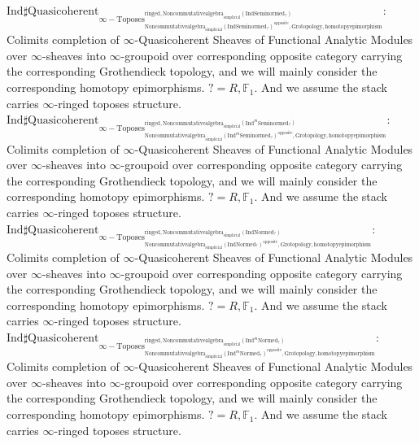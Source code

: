\documentclass[11pt]{book}
\theoremstyle{definition}
\numberwithin{equation}{section}
\begin{document}
 \noindent $\mathrm{Ind}\mathrm{\sharp Quasicoherent}_{\infty-\mathrm{Toposes}^{\mathrm{ringed},\mathrm{Noncommutativealgebra}_{\mathrm{simplicial}}(\mathrm{Ind}\mathrm{Seminormed}_?)}_{\mathrm{Noncommutativealgebra}_{\mathrm{simplicial}}(\mathrm{Ind}\mathrm{Seminormed}_?)^\mathrm{opposite},\mathrm{Grotopology,homotopyepimorphism}}}$: Colimits completion of $\infty$-Quasicoherent Sheaves of Functional Analytic Modules over $\infty$-sheaves into $\infty$-groupoid over corresponding opposite category carrying the corresponding Grothendieck topology, and we will mainly consider the corresponding homotopy epimorphisms. $?=R,\mathbb{F}_1$. And we assume the stack carries $\infty$-ringed toposes structure. \\
\noindent $\mathrm{Ind}\mathrm{\sharp Quasicoherent}_{\infty-\mathrm{Toposes}^{\mathrm{ringed},\mathrm{Noncommutativealgebra}_{\mathrm{simplicial}}(\mathrm{Ind}^m\mathrm{Seminormed}_?)}_{\mathrm{Noncommutativealgebra}_{\mathrm{simplicial}}(\mathrm{Ind}^m\mathrm{Seminormed}_?)^\mathrm{opposite},\mathrm{Grotopology,homotopyepimorphism}}}$: Colimits completion of $\infty$-Quasicoherent Sheaves of Functional Analytic Modules over $\infty$-sheaves into $\infty$-groupoid over corresponding opposite category carrying the corresponding Grothendieck topology, and we will mainly consider the corresponding homotopy epimorphisms. $?=R,\mathbb{F}_1$. And we assume the stack carries $\infty$-ringed toposes structure.\\
\noindent $\mathrm{Ind}\mathrm{\sharp Quasicoherent}_{\infty-\mathrm{Toposes}^{\mathrm{ringed},\mathrm{Noncommutativealgebra}_{\mathrm{simplicial}}(\mathrm{Ind}\mathrm{Normed}_?)}_{\mathrm{Noncommutativealgebra}_{\mathrm{simplicial}}(\mathrm{Ind}\mathrm{Normed}_?)^\mathrm{opposite},\mathrm{Grotopology,homotopyepimorphism}}}$: Colimits completion of $\infty$-Quasicoherent Sheaves of Functional Analytic Modules over $\infty$-sheaves into $\infty$-groupoid over corresponding opposite category carrying the corresponding Grothendieck topology, and we will mainly consider the corresponding homotopy epimorphisms. $?=R,\mathbb{F}_1$. And we assume the stack carries $\infty$-ringed toposes structure.\\
\noindent $\mathrm{Ind}\mathrm{\sharp Quasicoherent}_{\infty-\mathrm{Toposes}^{\mathrm{ringed},\mathrm{Noncommutativealgebra}_{\mathrm{simplicial}}(\mathrm{Ind}^m\mathrm{Normed}_?)}_{\mathrm{Noncommutativealgebra}_{\mathrm{simplicial}}(\mathrm{Ind}^m\mathrm{Normed}_?)^\mathrm{opposite},\mathrm{Grotopology,homotopyepimorphism}}}$: Colimits completion of $\infty$-Quasicoherent Sheaves of Functional Analytic Modules over $\infty$-sheaves into $\infty$-groupoid over corresponding opposite category carrying the corresponding Grothendieck topology, and we will mainly consider the corresponding homotopy epimorphisms. $?=R,\mathbb{F}_1$. And we assume the stack carries $\infty$-ringed toposes structure.\\
\end{document}
